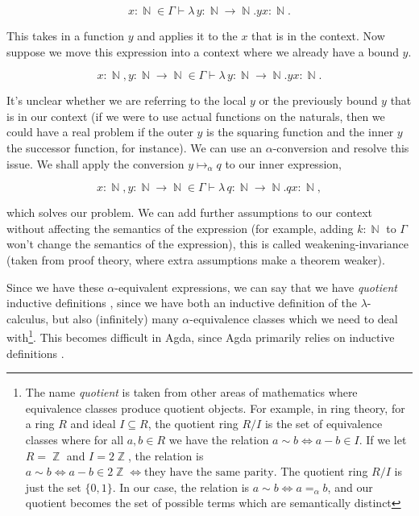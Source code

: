 \documentclass[logo,bsc,singlespacing,parskip,online]{infthesis}
\DeclareMathOperator{\nat}{\mathbb{N}}
\DeclareMathOperator{\integer}{\mathbb{Z}}
\begin{document}
\begin{equation*}
  x \colon \nat \in \Gamma \vdash \lambda \, y \colon \nat \to \nat. y x \colon \nat.
\end{equation*}

This takes in a function $y$ and applies it to the $x$ that is in the context.
Now suppose we move this expression into a context where we already have a bound
$y$.

\begin{equation*}
  x \colon \nat, y \colon \nat \to \nat \in \Gamma \vdash \lambda \, y \colon \nat \to \nat. y x \colon \nat.
\end{equation*}

It's unclear whether we are referring to the local $y$ or the previously bound
$y$ that is in our context (if we were to use actual functions on the naturals,
then we could have a real problem if the outer $y$ is the squaring function and
the inner $y$ the successor function, for instance). We can use an
$\alpha$-conversion and resolve this issue. We shall apply the conversion $y
\mapsto_{\alpha} q$ to our inner expression,

\begin{equation*}
  x \colon \nat, y \colon \nat \to \nat \in \Gamma \vdash \lambda \, q \colon \nat \to \nat. q x \colon \nat,
\end{equation*}

which solves our problem. We can add further assumptions to our context without
affecting the semantics of the expression (for example, adding $k \colon \nat$
to $\Gamma$ won't change the semantics of the expression), this is called
weakening-invariance (taken from proof theory, where extra assumptions make a
theorem weaker).

Since we have these $\alpha$-equivalent expressions, we can say that we have
\textit{quotient} inductive definitions \citep{aydemir_engineering_2008}, since
we have both an inductive definition of the $\lambda$-calculus, but also
(infinitely) many $\alpha$-equivalence classes which we need to deal
with\footnote{The name \textit{quotient} is taken from other areas of
mathematics where equivalence classes produce quotient objects. For example, in
ring theory, for a ring $R$ and ideal $I \subseteq R$, the quotient ring $R/I$
is the set of equivalence classes where for all $a, b \in R$ we have the
relation $a \sim b \iff a - b \in I$. If we let $R = \integer$ and $I =
2\integer$, the relation is $a \sim b \iff a - b \in 2\integer \iff \text{they
have the same parity}$. The quotient ring $R/I$ is just the set $\{0, 1\}$. In
our case, the relation is $a \sim b \iff a =_{\alpha} b$, and our quotient
becomes the set of possible terms which are semantically distinct}. This becomes
difficult in Agda, since Agda primarily relies on inductive definitions
\citep{pitts_locally_2023}.
\end{document}

